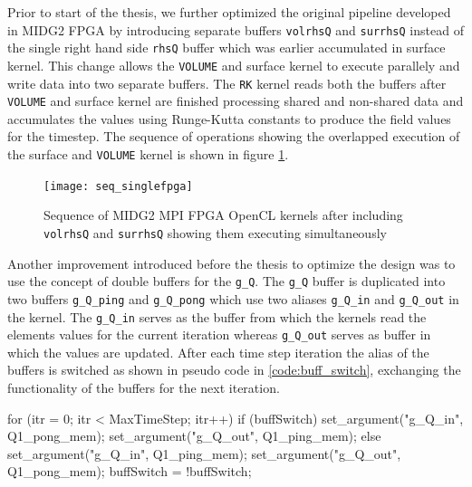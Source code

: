 Prior to start of the thesis, we further optimized the original pipeline developed in MIDG2 FPGA
by introducing separate buffers \texttt{volrhsQ} and \texttt{surrhsQ} instead of the single
right hand side \texttt{rhsQ} buffer which was earlier accumulated in surface kernel.
This change allows the \texttt{VOLUME} and surface kernel to execute parallely and write data into
two separate buffers. The \texttt{RK} kernel reads both the buffers after \texttt{VOLUME} and surface kernel
are finished processing shared and non-shared data and accumulates the values using Runge-Kutta
constants to produce the field values for the timestep. The sequence of operations
showing the overlapped execution of the surface and \texttt{VOLUME} kernel is shown in figure \ref{fig:seq_singlefpga}.

\begin{figure}[ht]%
    \centering
    \texttt{[image: seq\_singlefpga]}
    \caption{Sequence of MIDG2 MPI FPGA OpenCL kernels after including \texttt{volrhsQ} and \texttt{surrhsQ}
    showing them executing simultaneously}
    \label{fig:seq_singlefpga}
\end{figure}

Another improvement introduced before the thesis
to optimize the design was to use the concept of double buffers for the \texttt{g\_Q}.
The \texttt{g\_Q} buffer is duplicated into two buffers \texttt{g\_Q\_ping} and \texttt{g\_Q\_pong}
which use two aliases \texttt{g\_Q\_in} and \texttt{g\_Q\_out} in the kernel. The \texttt{g\_Q\_in}
serves as the buffer from which the kernels read the elements values for the current iteration whereas
\texttt{g\_Q\_out} serves as buffer in which the values
are updated. After each time step iteration the alias of the buffers is switched as shown
in pseudo code in \ref{code:buff_switch}, exchanging the functionality of the buffers for the next iteration.
\begin{CppCode}[caption=Buffer switching for double buffers in each iteration, frame=tlrb, label=code:buff_switch]
for (itr = 0; itr < MaxTimeStep; itr++)
{
    if (buffSwitch)
    {
        set_argument("g_Q_in", Q1_pong_mem);
        set_argument("g_Q_out", Q1_ping_mem);
    }
    else
    {
        set_argument("g_Q_in", Q1_ping_mem);
        set_argument("g_Q_out", Q1_pong_mem);
    }
    buffSwitch = !buffSwitch;
}
\end{CppCode}

